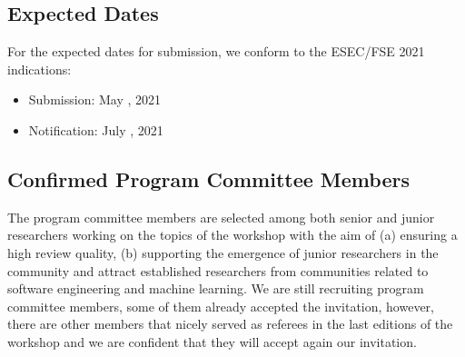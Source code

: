 \subsection{Expected Dates}

For the expected dates for submission, we conform to the ESEC/FSE 2021 indications:
\begin{itemize}[topsep=0.5em, itemsep=0.5em]
	\item Submission: May , 2021
	\item Notification: July , 2021
\end{itemize}


\subsection{Confirmed Program Committee Members}
The program committee members are selected among both senior and junior researchers working on the topics of the workshop with the aim of (a) ensuring a high review quality, (b) supporting the emergence of junior researchers in the community and attract established researchers from communities related to software engineering and machine learning.
We are still recruiting program committee members, some of them already accepted the invitation, however, there are other members that nicely served as referees in the last editions of the workshop and we are confident that they will accept again our invitation.

